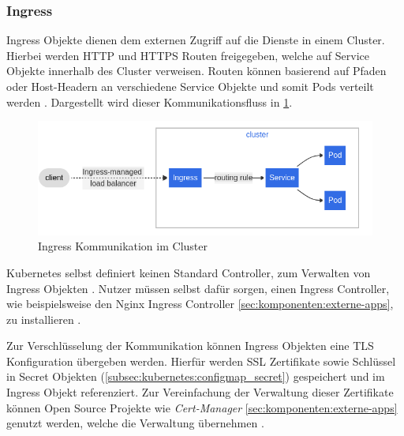 \subsubsection{Ingress}
\label{subsec:kubernetes:ingress}
Ingress Objekte dienen dem externen Zugriff auf die Dienste in einem Cluster.
Hierbei werden HTTP und HTTPS Routen freigegeben, 
welche auf Service Objekte innerhalb des Cluster verweisen.
Routen können basierend auf Pfaden oder Host-Headern an verschiedene Service Objekte und somit Pods verteilt werden \cite{kubernetesIngress}.
Dargestellt wird dieser Kommunikationsfluss in \ref{fig:ingress_communication}.

\begin{figure}[h]
  \centering
  \includegraphics[width=\textwidth]{gfx/chapters/2_grundlagen/ingress.png}
  \caption{Ingress Kommunikation im Cluster}
  \label{fig:ingress_communication}
\end{figure}

Kubernetes selbst definiert keinen Standard Controller, zum Verwalten von Ingress Objekten \cite{Burns2019}.
Nutzer müssen selbst dafür sorgen, einen Ingress Controller, 
wie beispielsweise den Nginx Ingress Controller \ref{sec:komponenten:externe-apps}, zu installieren \cite{Burns2019}.

Zur Verschlüsselung der Kommunikation können Ingress Objekten eine TLS Konfiguration übergeben werden.
Hierfür werden SSL Zertifikate sowie Schlüssel in Secret Objekten (\ref{subsec:kubernetes:configmap_secret}) gespeichert und im
Ingress Objekt referenziert. 
Zur Vereinfachung der Verwaltung dieser Zertifikate können Open Source Projekte wie \emph{Cert-Manager} \ref{sec:komponenten:externe-apps}
genutzt werden, welche die Verwaltung übernehmen \cite{Burns2019}.